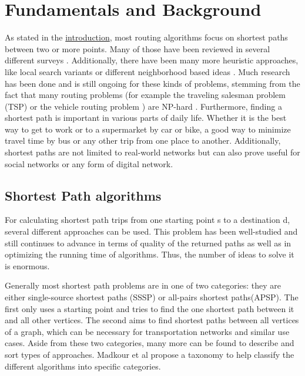 \chapter{Fundamentals and Background}
\label{chapter:fundamentals}

As stated in the \href{chapter:introduction}{introduction}, most routing algorithms focus on shortest paths between two or more points.
Many of those have been reviewed in several different surveys \cite{madkourSurveyShortestPathAlgorithms2017, sommerShortestpathQueriesStatic2014, wayahdiGreedyAStarDijkstra2021}.
Additionally, there have been many more heuristic approaches, like local search variants \cite{braysyVehicleRoutingProblem2005, irnichSequentialSearchIts2006, ropkeHeuristicExactAlgorithms2005} or different neighborhood based ideas \cite{braysyVehicleRoutingProblem2005, irnichSequentialSearchIts2006, ropkeHeuristicExactAlgorithms2005}.
Much research has been done and is still ongoing for these kinds of problems, stemming from the fact that many routing problems (for example the traveling salesman problem (TSP) \cite{gendreauHandbookMetaheuristics2010} or the vehicle routing problem \cite{braysyVehicleRoutingProblem2005, irnichSequentialSearchIts2006}) are NP-hard \cite{reineltTravelingSalesmanComputational2003}. 
Furthermore, finding a shortest path is important in various parts of daily life.
Whether it is the best way to get to work or to a supermarket by car or bike, a good way to minimize travel time by bus or any other trip from one place to another.
Additionally, shortest paths are not limited to real-world networks but can also prove useful for social networks or any form of digital network. \cite{madkourSurveyShortestPathAlgorithms2017}

\section{Shortest Path algorithms}
\label{sec:shortestPath}

For calculating shortest path trips from one starting point s to a destination d, several different approaches can be used.
This problem has been well-studied and still continues to advance in terms of quality of the returned paths as well as in optimizing the running time of algorithms.
Thus, the number of ideas to solve it is enormous. 

Generally most shortest path problems are in one of two categories: they are either single-source shortest paths (SSSP) or all-pairs shortest paths(APSP).
The first only uses a starting point and tries to find the one shortest path between it and all other vertices.
The second aims to find shortest paths between all vertices of a graph, which can be necessary for transportation networks and similar use cases. 
Aside from these two categories, many more can be found to describe and sort types of approaches. 
Madkour et al propose a taxonomy to help classify the different algorithms into specific categories. \cite{madkourSurveyShortestPathAlgorithms2017} 

